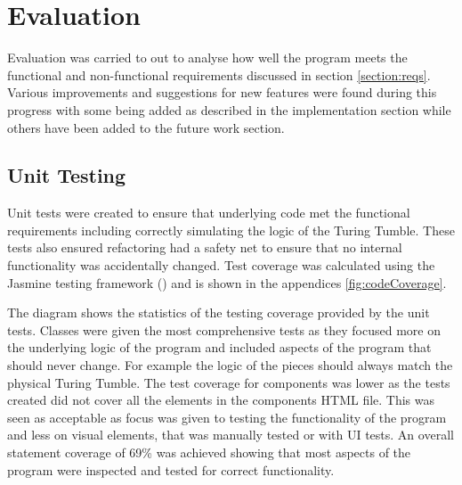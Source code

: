 \documentclass{l4proj}
\begin{document}
\chapter{Evaluation}
\label{section:evaluation}
Evaluation was carried to out to analyse how well the program meets the functional and non-functional requirements discussed in section \ref{section:reqs}. Various improvements and suggestions for new features were found during this progress with some being added as described in the implementation section while others have been added to the future work section. 

\section{Unit Testing}
Unit tests were created to ensure that underlying code met the functional requirements including correctly simulating the logic of the Turing Tumble. These tests also ensured refactoring had a safety net to ensure that no internal functionality was accidentally changed. Test coverage was calculated using the Jasmine testing framework (\cite{jasmine}) and is shown in the appendices \ref{fig:codeCoverage}. 

The diagram shows the statistics of the testing coverage provided by the unit tests. Classes were given the most comprehensive tests as they focused more on the underlying logic of the program and included aspects of the program that should never change. For example the logic of the pieces should always match the physical Turing Tumble. The test coverage for components was lower as the tests created did not cover all the elements in the components HTML file. This was seen as acceptable as focus was given to testing the functionality of the program and less on visual elements, that was manually tested or with UI tests. An overall statement coverage of 69\% was achieved showing that most aspects of the program were inspected and tested for correct functionality.
\end{document}
